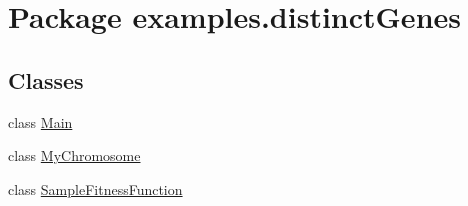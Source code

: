 \hypertarget{namespaceexamples_1_1distinct_genes}{\section{Package examples.\-distinct\-Genes}
\label{namespaceexamples_1_1distinct_genes}
}
\subsection*{Classes}
\begin{DoxyCompactItemize}
\item 
class \hyperlink{classexamples_1_1distinct_genes_1_1_main}{Main}
\item 
class \hyperlink{classexamples_1_1distinct_genes_1_1_my_chromosome}{My\-Chromosome}
\item 
class \hyperlink{classexamples_1_1distinct_genes_1_1_sample_fitness_function}{Sample\-Fitness\-Function}
\end{DoxyCompactItemize}
